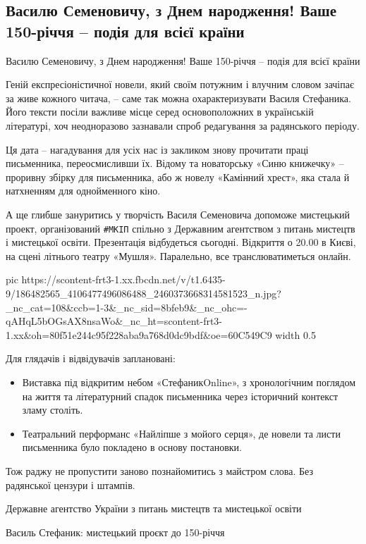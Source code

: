  
 
 
 
 

\subsection{Василю Семеновичу, з Днем народження! Ваше 150-річчя – подія для всієї країни}

Василю Семеновичу, з Днем народження! Ваше 150-річчя – подія для всієї країни

Геній експресіоністичної новели, який своїм потужним і влучним словом зачіпає
за живе кожного читача, – саме так можна охарактеризувати Василя Стефаника.
Його тексти посіли важливе місце серед основоположних в українській літературі,
хоч неодноразово зазнавали спроб редагування за радянського періоду.

Ця дата – нагадування для усіх нас із закликом знову прочитати праці
письменника, переосмисливши їх. Відому та новаторську «Синю книжечку» –
проривну збірку для письменника, або ж новелу «Камінний хрест», яка стала й
натхненням для однойменного кіно. 

А ще глибше зануритись у творчість Василя Семеновича допоможе мистецький
проект, організований \verb|#МКІП| спільно з Державним агентством з питань мистецтв і
мистецької освіти. Презентація відбудеться сьогодні. Відкриття о 20.00 в Києві,
на сцені літнього театру «Мушля». Паралельно, все транслюватиметься онлайн. 

\ifcmt
  pic https://scontent-frt3-1.xx.fbcdn.net/v/t1.6435-9/186482565_4106477496086488_2460373668314581523_n.jpg?_nc_cat=108&ccb=1-3&_nc_sid=8bfeb9&_nc_ohc=-qAHqL5bOGsAX8nsaWo&_nc_ht=scontent-frt3-1.xx&oh=80f51e244c95f228aba9a768d0dc9bdf&oe=60C549C9
  width 0.5
\fi

Для глядачів і відвідувачів заплановані:

\begin{itemize}
  
\item Виставка під відкритим небом «СтефаникOnline», з хронологічним поглядом на життя та літературний спадок письменника через історичний контекст зламу століть.

\item Театральний перформанс «Найліпше з мойого серця», де новели та листи
        письменника було покладено в основу постановки.
\end{itemize}

Тож раджу не пропустити заново познайомитись з майстром слова. Без радянської цензури і штампів.

Державне агентство України з питань мистецтв та мистецької освіти

Василь Стефаник: мистецький проєкт до 150-річчя
